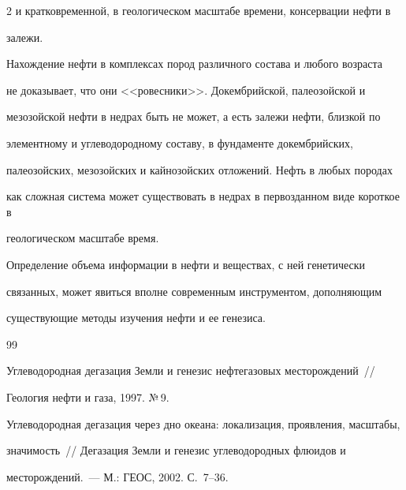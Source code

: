 \begin{multicols}{2}
и кратковременной, в геологическом масштабе времени, консервации нефти в 

залежи.

     

     Нахождение нефти в комплексах пород различного состава и любого возраста 

не доказывает, что они <<ровесники>>. Докембрийской, палеозойской и 

мезозойской нефти в недрах быть не может, а есть залежи нефти, близкой по 

элементному и углеводородному составу, в фундаменте докембрийских, 

палеозойских, мезозойских и кайнозойских отложений. Нефть в любых породах 

как сложная сис\-те\-ма может существовать в недрах в первозданном виде короткое в 

геологическом масштабе время.

     

     Определение объема информации в нефти и веществах, с ней генетически 

связанных, может явиться вполне современным инструментом, дополняющим 

существующие методы изучения нефти и ее генезиса.



{\small\frenchspacing

{%


\begin{thebibliography}{99}     





Углеводородная дегазация Земли и генезис нефтегазовых месторождений~// 

Геология нефти и газа, 1997. №\,9.





Углеводородная дегазация через дно океана: локализация, проявления, масштабы, 

значимость~// Дегазация Земли и генезис углеводородных флюидов и 

месторождений.~--- М.: ГЕОС, 2002. С.~7--36.





\end{thebibliography}}}
\end{multicols}
